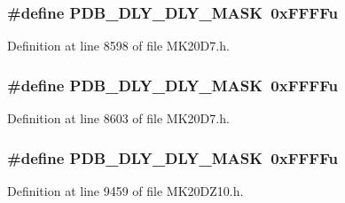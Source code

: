 \subsubsection[{\texorpdfstring{P\+D\+B\+\_\+\+D\+L\+Y\+\_\+\+D\+L\+Y\+\_\+\+M\+A\+SK}{PDB_DLY_DLY_MASK}}]{\setlength{\rightskip}{0pt plus 5cm}\#define P\+D\+B\+\_\+\+D\+L\+Y\+\_\+\+D\+L\+Y\+\_\+\+M\+A\+SK~0x\+F\+F\+F\+Fu}\hypertarget{group___p_d_b___register___masks_ga79150887ba3f74efde99b40d3b9c5e44}{}\label{group___p_d_b___register___masks_ga79150887ba3f74efde99b40d3b9c5e44}


Definition at line 8598 of file M\+K20\+D7.\+h.

\subsubsection[{\texorpdfstring{P\+D\+B\+\_\+\+D\+L\+Y\+\_\+\+D\+L\+Y\+\_\+\+M\+A\+SK}{PDB_DLY_DLY_MASK}}]{\setlength{\rightskip}{0pt plus 5cm}\#define P\+D\+B\+\_\+\+D\+L\+Y\+\_\+\+D\+L\+Y\+\_\+\+M\+A\+SK~0x\+F\+F\+F\+Fu}\hypertarget{group___p_d_b___register___masks_ga79150887ba3f74efde99b40d3b9c5e44}{}\label{group___p_d_b___register___masks_ga79150887ba3f74efde99b40d3b9c5e44}


Definition at line 8603 of file M\+K20\+D7.\+h.

\subsubsection[{\texorpdfstring{P\+D\+B\+\_\+\+D\+L\+Y\+\_\+\+D\+L\+Y\+\_\+\+M\+A\+SK}{PDB_DLY_DLY_MASK}}]{\setlength{\rightskip}{0pt plus 5cm}\#define P\+D\+B\+\_\+\+D\+L\+Y\+\_\+\+D\+L\+Y\+\_\+\+M\+A\+SK~0x\+F\+F\+F\+Fu}\hypertarget{group___p_d_b___register___masks_ga79150887ba3f74efde99b40d3b9c5e44}{}\label{group___p_d_b___register___masks_ga79150887ba3f74efde99b40d3b9c5e44}


Definition at line 9459 of file M\+K20\+D\+Z10.\+h.

